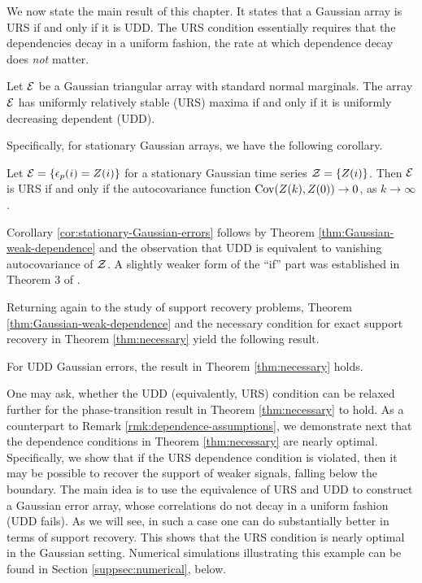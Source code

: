 We now state the main result of this chapter.  It states that a Gaussian array is URS if and only if it is UDD.
The URS condition essentially requires that the dependencies decay in a uniform fashion, the rate at which dependence decay 
does \emph{not} matter.

\begin{theorem} \label{thm:Gaussian-weak-dependence}
Let ${\cal E}$ be a Gaussian triangular array with standard normal marginals.  
The array ${\cal E}$ has uniformly relatively stable (URS) maxima if and only if it is uniformly decreasing dependent (UDD).
\end{theorem}


Specifically, for stationary Gaussian arrays, we have the following corollary.

\begin{corollary} \label{cor:stationary-Gaussian-errors}
Let ${\cal E} = \{\epsilon_p(i) = Z(i)\}$ for a stationary Gaussian time series ${\cal Z} = \{Z(i)\}$.
Then $\cal E$ is {URS} if and only if the autocovariance function ${\rm {Cov}}(Z(k), Z(0))\to 0$, as $k\to\infty$.
\end{corollary}

Corollary \ref{cor:stationary-Gaussian-errors} follows by Theorem \ref{thm:Gaussian-weak-dependence} and the observation that UDD is equivalent to vanishing autocovariance of $\cal Z$.
A slightly weaker form of the ``if'' part was established in Theorem 3 of \cite{berman1964limit}.

Returning again to the study of support recovery problems, Theorem \ref{thm:Gaussian-weak-dependence} and the necessary condition for exact support recovery in Theorem \ref{thm:necessary} yield the following result.

\begin{corollary} \label{cor:weakly-dependent-errors}
For UDD Gaussian errors, the result in Theorem \ref{thm:necessary} holds.
\end{corollary}

One may ask, whether the UDD (equivalently, URS) condition can be relaxed further for the phase-transition result in Theorem \ref{thm:necessary} to 
hold.  As a counterpart to Remark \ref{rmk:dependence-assumptions}, we demonstrate next that the dependence conditions in Theorem \ref{thm:necessary} 
are nearly optimal.  Specifically, we show that if the URS dependence condition is violated, then it may be possible to recover the support 
of weaker signals, falling below the boundary.   The main idea is to use the equivalence of URS and UDD to construct a Gaussian error array,
whose correlations do not decay in a uniform fashion (UDD fails). As we will see, in such a case one can do substantially better in terms of 
support recovery.  This shows that the URS condition is nearly optimal in the Gaussian setting.  
Numerical simulations illustrating this example can be found in Section \ref{suppsec:numerical}, below. 

